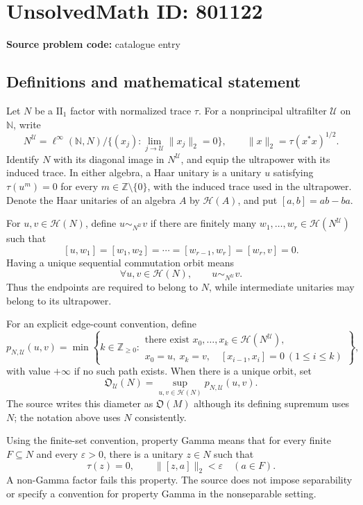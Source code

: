 \documentclass[11pt]{article}
\newcommand{\N}{\mathbb{N}}
\newcommand{\Z}{\mathbb{Z}}
\begin{document}
\section*{UnsolvedMath ID: 801122}
\textbf{Source problem code:} catalogue entry
\subsection{Definitions and mathematical statement}
Let \(N\) be a \(\mathrm{II}_1\) factor with normalized trace \(\tau\). For a nonprincipal ultrafilter \(\mathcal U\) on \(\N\), write
\[
N^{\mathcal U}=\ell^\infty(\N,N)\big/\{(x_j):\lim_{j\to\mathcal U}\|x_j\|_2=0\},
\qquad \|x\|_2=\tau(x^*x)^{1/2}.
\]
Identify \(N\) with its diagonal image in \(N^{\mathcal U}\), and equip the ultrapower with its induced trace. In either algebra, a Haar unitary is a unitary \(u\) satisfying \(\tau(u^m)=0\) for every \(m\in\Z\setminus\{0\}\), with the induced trace used in the ultrapower. Denote the Haar unitaries of an algebra \(A\) by \(\mathcal H(A)\), and put \([a,b]=ab-ba\).

For \(u,v\in\mathcal H(N)\), define \(u\sim_{N^{\mathcal U}}v\) if there are finitely many \(w_1,\ldots,w_r\in\mathcal H(N^{\mathcal U})\) such that
\[
[u,w_1]=[w_1,w_2]=\cdots=[w_{r-1},w_r]=[w_r,v]=0.
\]
Having a unique sequential commutation orbit means
\[
\forall u,v\in\mathcal H(N),\qquad u\sim_{N^{\mathcal U}}v.
\]
Thus the endpoints are required to belong to \(N\), while intermediate unitaries may belong to its ultrapower.

For an explicit edge-count convention, define
\[
p_{N,\mathcal U}(u,v)=\min\left\{k\in\Z_{\geq0}:\begin{array}{l}
\text{there exist }x_0,\ldots,x_k\in\mathcal H(N^{\mathcal U}),\\
x_0=u,\ x_k=v,\quad [x_{i-1},x_i]=0\ (1\leq i\leq k)
\end{array}\right\},
\]
with value \(+\infty\) if no such path exists. When there is a unique orbit, set
\[
\mathfrak O_{\mathcal U}(N)=\sup_{u,v\in\mathcal H(N)}p_{N,\mathcal U}(u,v).
\]
The source writes this diameter as \(\mathfrak O(M)\) although its defining supremum uses \(N\); the notation above uses \(N\) consistently.

Using the finite-set convention, property Gamma means that for every finite \(F\subseteq N\) and every \(\varepsilon>0\), there is a unitary \(z\in N\) such that
\[
\tau(z)=0,\qquad \|[z,a]\|_2<\varepsilon\quad(a\in F).
\]
A non-Gamma factor fails this property. The source does not impose separability or specify a convention for property Gamma in the nonseparable setting.
\end{document}
